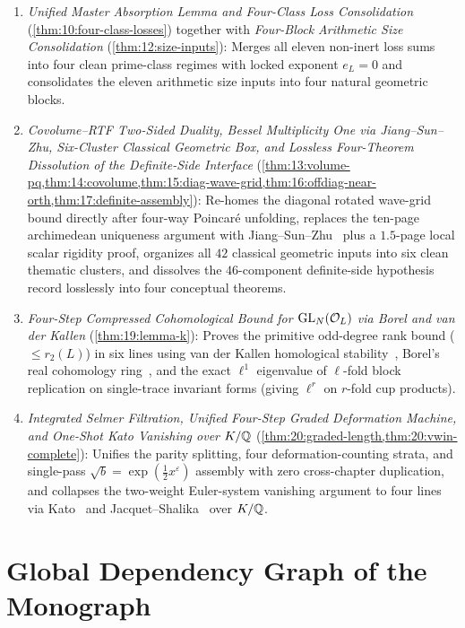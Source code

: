 \begin{enumerate}[label=\textbf{O\arabic*.}]
\item \emph{Unified Master Absorption Lemma and Four-Class Loss Consolidation} (\cref{thm:10:four-class-losses}) together with \emph{Four-Block Arithmetic Size Consolidation} (\cref{thm:12:size-inputs}): Merges all eleven non-inert loss sums into four clean prime-class regimes with locked exponent $e_L = 0$ and consolidates the eleven arithmetic size inputs into four natural geometric blocks.
\item \emph{Covolume--RTF Two-Sided Duality, Bessel Multiplicity One via Jiang--Sun--Zhu, Six-Cluster Classical Geometric Box, and Lossless Four-Theorem Dissolution of the Definite-Side Interface} (\cref{thm:13:volume-pq,thm:14:covolume,thm:15:diag-wave-grid,thm:16:offdiag-near-orth,thm:17:definite-assembly}): Re-homes the diagonal rotated wave-grid bound directly after four-way Poincar\'e unfolding, replaces the ten-page archimedean uniqueness argument with Jiang--Sun--Zhu~\cite{JiangSunZhu2010} plus a $1.5$-page local scalar rigidity proof, organizes all $42$ classical geometric inputs into six clean thematic clusters, and dissolves the $46$-component definite-side hypothesis record losslessly into four conceptual theorems.
\item \emph{Four-Step Compressed Cohomological Bound for $\mathrm{GL}_N(\mathcal{O}_L)$ via Borel and van der Kallen} (\cref{thm:19:lemma-k}): Proves the primitive odd-degree rank bound ($\le r_2(L)$) in six lines using van der Kallen homological stability~\cite{vanderKallen1980}, Borel's real cohomology ring~\cite{Borel1974}, and the exact $\ell^1$ eigenvalue of $\ell$-fold block replication on single-trace invariant forms (giving $\ell^r$ on $r$-fold cup products).
\item \emph{Integrated Selmer Filtration, Unified Four-Step Graded Deformation Machine, and One-Shot Kato Vanishing over $K/\mathbb{Q}$} (\cref{thm:20:graded-length,thm:20:vwin-complete}): Unifies the parity splitting, four deformation-counting strata, and single-pass $\sqrt{b} = \exp(\frac{1}{2}x^\varepsilon)$ assembly with zero cross-chapter duplication, and collapses the two-weight Euler-system vanishing argument to four lines via Kato~\cite[Theorem~14.2(1)]{Kato2004} and Jacquet--Shalika~\cite{JacquetShalika1976} over $K/\mathbb{Q}$.
\end{enumerate}

\section{Global Dependency Graph of the Monograph}
\label{sec:00:dag}

